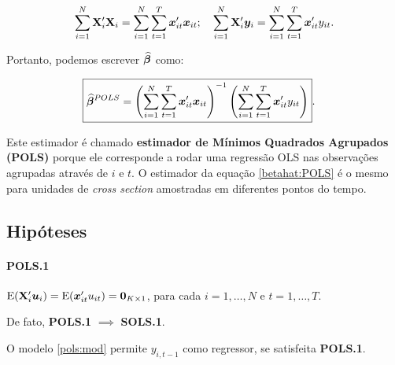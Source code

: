 \documentclass[11pt, oneside, a4paper, article]{article}
\numberwithin{equation}{section}
\begin{document}
\begin{remark}

\begin{align*}
\sum_{i=1}^{N} \mathbf{X}_{i}' \mathbf{X}_{i}
=
\sum_{i=1}^{N} \sum_{t=1}^{T} \boldsymbol{x}_{it}' \boldsymbol{x}_{it};
\quad
\sum_{i=1}^{N} \mathbf{X}_{i}' \boldsymbol{y}_{i}
=
\sum_{i=1}^{N} \sum_{t=1}^{T} \boldsymbol{x}_{it}' y_{it}.
\end{align*}

Portanto, podemos escrever $\widehat{\boldsymbol{\beta}}$ como:

\vspace{-1 em}
\begin{align} \label{betahat:POLS}
\Aboxed{
\betahatbold^{POLS} =
\left( \sum_{i=1}^{N} \sum_{t=1}^{T} \mbs{x}_{it}' \mbs{x}_{it} \right)^{-1}
\left( \sum_{i=1}^{N} \sum_{t=1}^{T} \mbs{x}_{it}' y_{it} \right)
}.
\end{align}

Este estimador é chamado \textbf{estimador de Mínimos Quadrados Agrupados (POLS)} porque ele corresponde a rodar uma regressão OLS nas observações agrupadas através de $i$ e $t$. 
O estimador da equação \eqref{betahat:POLS} é o mesmo para unidades de \textit{cross section} amostradas em diferentes pontos do tempo.
\end{remark}

\subsection{Hipóteses}

\paragraph{POLS.1} $\text{E}(\mathbf{X}_{i}' \boldsymbol{u}_{i}) = \text{E}(\boldsymbol{x}_{it}'u_{it}) = \boldsymbol{0}_{K \times 1}$, para cada
$i=1, \dots, N$ e $t=1, \dots, T$.

\noindent
De fato, \textbf{POLS.1} $\implies$ \textbf{SOLS.1}.

\begin{remark}
	O modelo \eqref{pols:mod} permite $y_{i,t-1}$ como regressor, se satisfeita \textbf{POLS.1}.
\end{remark}
\end{document}
